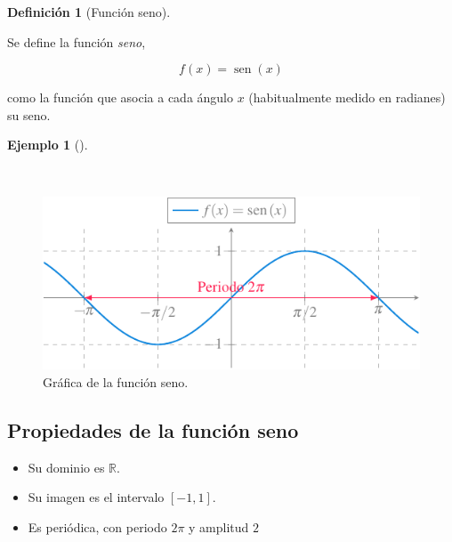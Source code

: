 \documentclass[
  a4paper,
]{scrreport}
\providecommand{\tightlist}{%
  \setlength{\itemsep}{0pt}\setlength{\parskip}{0pt}}\usepackage{longtable,booktabs,array}
\theoremstyle{definition}
\newtheorem{example}{Ejemplo}[chapter]
\theoremstyle{plain}
\theoremstyle{definition}
\newtheorem{definition}{Definición}[chapter]
\theoremstyle{definition}
\theoremstyle{plain}
\theoremstyle{plain}
\theoremstyle{remark}
\begin{document}
\begin{definition}[Función
seno]\protect\hypertarget{def-funcion-seno}{}\label{def-funcion-seno}

Se define la función \emph{seno},

\[f(x)=\operatorname{sen}(x)\]

como la función que asocia a cada ángulo \(x\) (habitualmente medido en
radianes) su seno.

\end{definition}

\begin{example}[]\protect\hypertarget{exm-funcion-seno}{}\label{exm-funcion-seno}

~

\begin{figure}[H]

{\centering \includegraphics[width=5.20833in,height=\textheight]{./img/funciones/funcion-seno.pdf}

}

\caption{Gráfica de la función seno.}

\end{figure}%

\end{example}

\subsection{Propiedades de la función
seno}\label{propiedades-de-la-funciuxf3n-seno}

\begin{itemize}
\tightlist
\item
  Su dominio es \(\mathbb{R}\).
\item
  Su imagen es el intervalo \([-1,1]\).
\item
  Es periódica, con periodo \(2\pi\) y amplitud \(2\)
\end{itemize}
\end{document}
